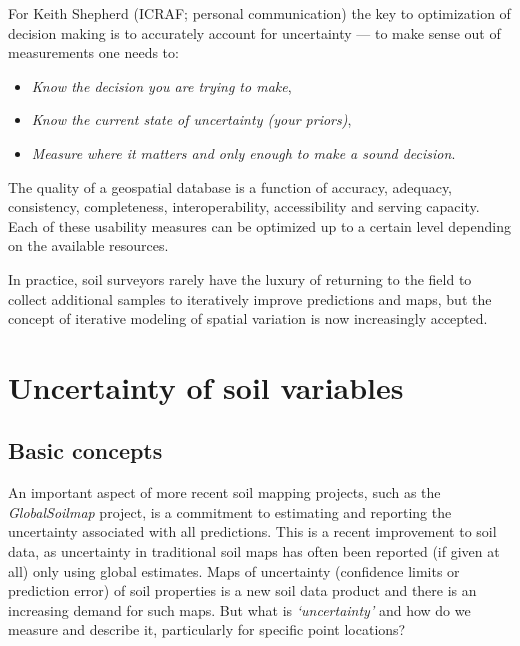 \documentclass[11pt]{krantz}
\makeatletter
\newenvironment{kframe}{%
\medskip{}
\setlength{\fboxsep}{.8em}
 \def\at@end@of@kframe{}%
 \ifinner\ifhmode%
  \def\at@end@of@kframe{\end{minipage}}%
  \begin{minipage}{\columnwidth}%
 \fi\fi%
 \def\FrameCommand##1{\hskip\@totalleftmargin \hskip-\fboxsep
 \colorbox{shadecolor}{##1}\hskip-\fboxsep
     \hskip-\linewidth \hskip-\@totalleftmargin \hskip\columnwidth}%
 \MakeFramed {\advance\hsize-\width
   \@totalleftmargin\z@ \linewidth\hsize
   \@setminipage}}%
 {\par\unskip\endMakeFramed%
 \at@end@of@kframe}
\newenvironment{rmdblock}[1]
  {
  \begin{itemize}
  \renewcommand{\labelitemi}{
    \raisebox{-.7\height}[0pt][0pt]{
      {\setkeys{Gin}{width=3em,keepaspectratio}\texttt{[image: images/\#1]}}
    }
  }
  \setlength{\fboxsep}{1em}
  \begin{kframe}
  \item
  }
  {
  \end{kframe}
  \end{itemize}
  }
\newenvironment{rmdnote}
  {\begin{rmdblock}{note}}
  {\end{rmdblock}}
\theoremstyle{definition}
\theoremstyle{definition}
\theoremstyle{definition}
\theoremstyle{remark}
\makeatother
\begin{document}
For Keith Shepherd (ICRAF; personal communication) the key to
optimization of decision making is to accurately account for uncertainty
--- to make sense out of measurements one needs to:

\begin{itemize}
\item
  \emph{Know the decision you are trying to make},
\item
  \emph{Know the current state of uncertainty (your priors)},
\item
  \emph{Measure where it matters and only enough to make a sound
  decision}.
\end{itemize}

\begin{rmdnote}
The quality of a geospatial database is a function of accuracy,
adequacy, consistency, completeness, interoperability, accessibility and
serving capacity. Each of these usability measures can be optimized up
to a certain level depending on the available resources.
\end{rmdnote}

In practice, soil surveyors rarely have the luxury of returning to the
field to collect additional samples to iteratively improve predictions
and maps, but the concept of iterative modeling of spatial variation is
now increasingly accepted.

\hypertarget{uncertainty-soil-variables}{%
\section{Uncertainty of soil
variables}\label{uncertainty-soil-variables}}

\hypertarget{basic-concepts}{%
\subsection{Basic concepts}\label{basic-concepts}}

An important aspect of more recent soil mapping projects, such as the
\emph{GlobalSoilmap} project, is a commitment to estimating and
reporting the uncertainty associated with all predictions. This is a
recent improvement to soil data, as uncertainty in traditional soil maps
has often been reported (if given at all) only using global estimates.
Maps of uncertainty (confidence limits or prediction error) of soil
properties is a new soil data product and there is an increasing demand
for such maps. But what is \emph{`uncertainty'} and how do we measure
and describe it, particularly for specific point locations?
\end{document}
